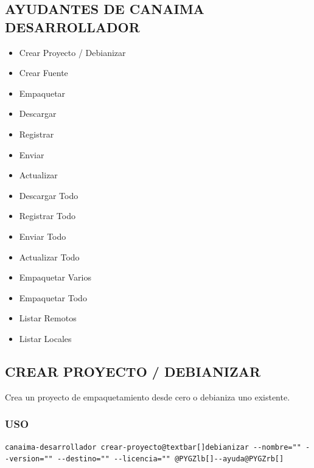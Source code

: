 \documentclass[letterpaper,12pt,spanish]{manual}
\begin{document}
\subsection{\textbf{AYUDANTES DE CANAIMA DESARROLLADOR}}
\begin{itemize}
\item {} 
Crear Proyecto / Debianizar

\item {} 
Crear Fuente

\item {} 
Empaquetar

\item {} 
Descargar

\item {} 
Registrar

\item {} 
Enviar

\item {} 
Actualizar

\item {} 
Descargar Todo

\item {} 
Registrar Todo

\item {} 
Enviar Todo

\item {} 
Actualizar Todo

\item {} 
Empaquetar Varios

\item {} 
Empaquetar Todo

\item {} 
Listar Remotos

\item {} 
Listar Locales

\end{itemize}


\subsection{\textbf{CREAR PROYECTO / DEBIANIZAR}}

Crea un proyecto de empaquetamiento desde cero o debianiza uno existente.


\subsubsection{USO}

\begin{Verbatim}[commandchars=@\[\]]
canaima-desarrollador crear-proyecto@textbar[]debianizar --nombre="" --version="" --destino="" --licencia="" @PYGZlb[]--ayuda@PYGZrb[]
\end{Verbatim}
\end{document}
